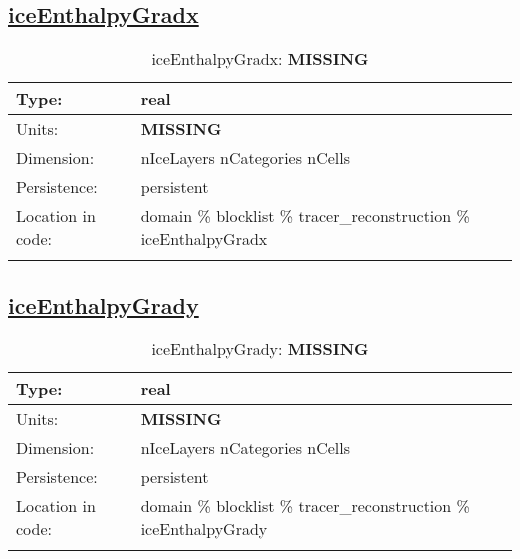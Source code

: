 \subsection[iceEnthalpyGradx]{\hyperref[sec:var_tab_tracer_reconstruction]{iceEnthalpyGradx}}
\label{subsec:var_sec_tracer_reconstruction_iceEnthalpyGradx}
\begin{center}
\begin{longtable}{| p{2.0in} | p{4.0in} |}
        \hline 
        Type: & real \\
        \hline 
        Units: & {\bf \color{red} MISSING} \\
        \hline 
        Dimension: & nIceLayers nCategories nCells \\
        \hline 
        Persistence: & persistent \\
        \hline 
         Location in code: & domain \% blocklist \% tracer\_reconstruction \% iceEnthalpyGradx \\
         \hline 
    \caption{iceEnthalpyGradx: {\bf \color{red} MISSING}}
\end{longtable}
\end{center}
\subsection[iceEnthalpyGrady]{\hyperref[sec:var_tab_tracer_reconstruction]{iceEnthalpyGrady}}
\label{subsec:var_sec_tracer_reconstruction_iceEnthalpyGrady}
\begin{center}
\begin{longtable}{| p{2.0in} | p{4.0in} |}
        \hline 
        Type: & real \\
        \hline 
        Units: & {\bf \color{red} MISSING} \\
        \hline 
        Dimension: & nIceLayers nCategories nCells \\
        \hline 
        Persistence: & persistent \\
        \hline 
         Location in code: & domain \% blocklist \% tracer\_reconstruction \% iceEnthalpyGrady \\
         \hline 
    \caption{iceEnthalpyGrady: {\bf \color{red} MISSING}}
\end{longtable}
\end{center}
